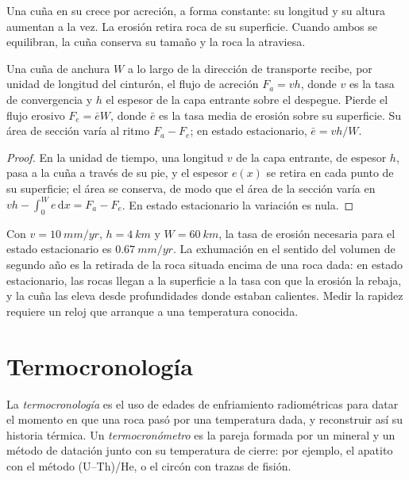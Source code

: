 Una cuña en su  crece por acreción, a forma constante: su longitud
y su altura aumentan a la vez. La erosión retira roca de su superficie. Cuando ambos
se equilibran, la cuña conserva su tamaño y la roca la atraviesa.

\begin{proposition}\label{prop:b3:orogenic-wedges:flux}
Una cuña de anchura $W$ a lo largo de la dirección de transporte recibe, por unidad de longitud
del cinturón, el flujo de acreción $F_a = v h$, donde $v$ es la tasa de
convergencia y $h$ el espesor de la capa entrante sobre el despegue. Pierde
el flujo erosivo $F_e = \bar e W$, donde $\bar e$ es la tasa media de
erosión sobre su superficie. Su área de sección varía al ritmo $F_a -
F_e$; en estado estacionario, $\bar e = vh/W$.
\end{proposition}

\begin{proof}
En la unidad de tiempo, una longitud $v$ de la capa entrante, de espesor $h$, pasa
a la cuña a través de su pie, y el espesor $e(x)$ se retira en cada
punto de su superficie; el área se conserva, de modo que el área de la sección
varía en $vh - \int_0^W e\,\mathrm dx = F_a - F_e$. En estado estacionario la
variación es nula.
\end{proof}

Con $v = \qty{10}{mm/yr}$, $h = \qty{4}{km}$ y $W = \qty{60}{km}$, la
tasa de erosión necesaria para el estado estacionario es $\qty{0.67}{mm/yr}$. La exhumación en el
sentido del volumen de segundo año es la retirada de la roca situada encima de una roca dada:
en estado estacionario, las rocas llegan a la superficie a la tasa con que la erosión
la rebaja, y la cuña las eleva desde profundidades donde estaban calientes. Medir la rapidez
requiere un reloj que arranque a una temperatura conocida.

\section{Termocronología}\label{sec:b3:orogenic-wedges:thermochronology}

\begin{definition}\label{def:b3:orogenic-wedges:thermochronology}
La \emph{termocronología} es el uso de
edades de enfriamiento radiométricas para datar el momento en que una roca pasó por una temperatura dada,
y reconstruir así su historia térmica. Un
\emph{termocronómetro} es la pareja formada por un mineral y
un método de datación junto con su temperatura de cierre: por ejemplo, el apatito con el
método (U--Th)/He, o el circón con trazas de fisión.
\end{definition}

